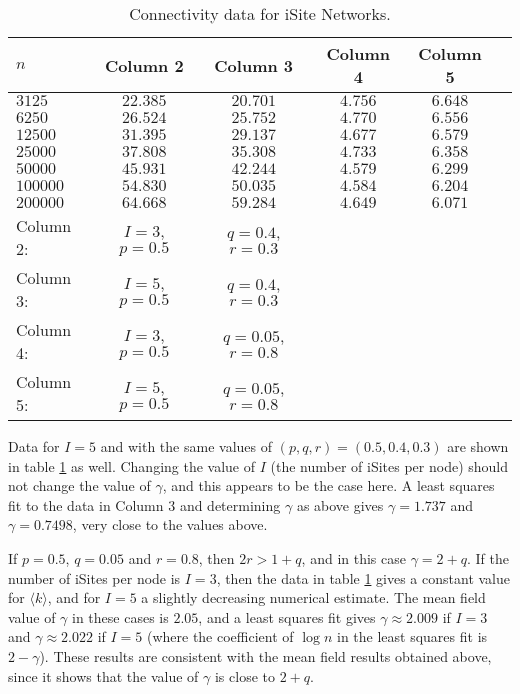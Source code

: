 \documentclass[12pt]{iopart}
\begin{document}
\begin{table}[t!]
\centering
\caption{Connectivity data for iSite Networks.}
      \begin{tabular}{lccccc}
        \hline
       $n$    &  Column 2  & Column 3 & Column 4 & Column 5 \\ \hline
        $3125$ & $22.385$ & $20.701$ & $4.756$ & $6.648$  \\
        $6250$ & $26.524$ & $25.752$ & $4.770$ & $6.556$ \\
        $12500$ & $31.395$ & $29.137$ & $4.677$ & $6.579$ \\
        $25000$ & $37.808$ & $35.308$ & $4.733$ & $6.358$ \\
        $50000$ & $45.931$ & $42.244$ & $4.579$ & $6.299$ \\
        $100000$ & $54.830$ & $50.035$ & $4.584$ & $6.204$ \\
        $200000$ & $64.668$ & $59.284$ & $4.649$ & $6.071$ \\ \hline
   Column 2: & $I=3$,\;$p=0.5$ & $q=0.4$,\;$r=0.3$ \\ 
   Column 3: & $I=5$,\;$p=0.5$ & $q=0.4$,\;$r=0.3$ \\
   Column 4: & $I=3$,\;$p=0.5$ & $q=0.05$,\;$r=0.8$ \\ 
   Column 5: & $I=5$,\;$p=0.5$ & $q=0.05$,\;$r=0.8$ \\ \hline
      \end{tabular}
\label{tableiSite}
\end{table}


Data for $I=5$ and with the same values of $(p,q,r)=(0.5,0.4,0.3)$ are shown in
table \ref{tableiSite} as well.  Changing the value of $I$ (the number of iSites per
node) should not change the value of $\gamma$, and this appears to be the
case here.  A least squares fit to the data in Column 3 and determining 
$\gamma$ as above gives $\gamma=1.737$ and $\gamma=0.7498$, very close
to the values above.


If $p=0.5$, $q=0.05$ and $r=0.8$, then $2r > 1+q$, and in this case $\gamma=2+q$.
If the number of iSites per node is $I=3$, then the data in table \ref{tableiSite} 
gives a constant value for $\langle k \rangle$, and for $I=5$ a slightly decreasing 
numerical estimate.  The mean field value of $\gamma$ in these cases is $2.05$, 
and a least squares fit gives $\gamma\approx 2.009$ if $I=3$ and 
$\gamma\approx 2.022$ if $I=5$ (where the coefficient of $\log n$ in the least 
squares fit is $2-\gamma$).  These results are consistent with the mean field 
results obtained above, since it shows that the value of $\gamma$ is close to $2+q$.
\end{document}
